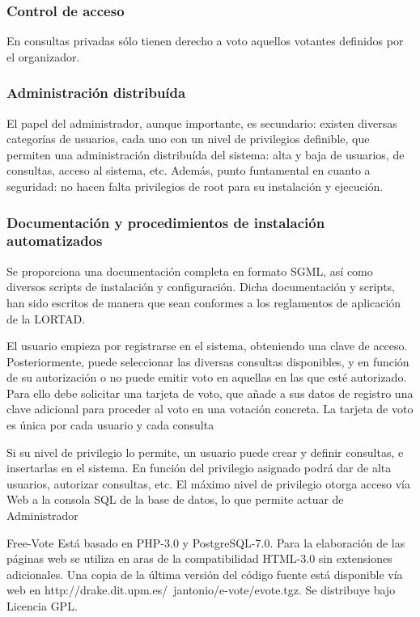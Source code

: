 \subsubsection*{Control de acceso}
En consultas privadas sólo tienen derecho a voto aquellos votantes definidos por el organizador.

\subsubsection*{Administración distribuída}
El papel del administrador, aunque importante, es secundario: existen diversas categorías de usuarios, cada uno con un nivel de privilegios definible, que permiten una administración distribuída del sistema: alta y baja de usuarios, de consultas, acceso al sistema, etc. Además, punto funtamental en cuanto a seguridad: no hacen falta privilegios de root para su instalación y ejecución.

\subsubsection*{Documentación y procedimientos de instalación automatizados}
Se proporciona una documentación completa en formato SGML, así como diversos scripts de instalación y configuración. Dicha documentación y scripts, han sido escritos de manera que sean conformes a los reglamentos de aplicación de la LORTAD.

El usuario empieza por registrarse en el sistema, obteniendo una clave de acceso. Posteriormente, puede seleccionar las diversas consultas disponibles, y en función de su autorización o no puede emitir voto en aquellas en las que esté autorizado. Para ello debe solicitar una tarjeta de voto, que añade a sus datos de registro una clave adicional para proceder al voto en una votación concreta. La tarjeta de voto es única por cada usuario y cada consulta

Si su nivel de privilegio lo permite, un usuario puede crear y definir consultas, e insertarlas en el sistema. En función del privilegio asignado podrá dar de alta usuarios, autorizar consultas, etc. El máximo nivel de privilegio otorga acceso vía Web a la consola SQL de la base de datos, lo que permite actuar de Administrador

Free-Vote Está basado en PHP-3.0 y PostgreSQL-7.0. Para la elaboración de las páginas web se utiliza en aras de la compatibilidad HTML-3.0 sin extensiones adicionales. Una copia de la última versión del código fuente está disponible vía web en http://drake.dit.upm.es/~jantonio/e-vote/evote.tgz. Se distribuye bajo Licencia GPL.


